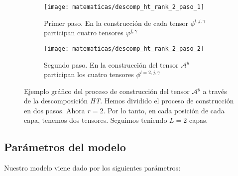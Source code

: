 \begin{figure}[H]
\centering
    \ajustarsubcaptions
    \begin{subfigure}{.5\textwidth}
        \centering
        \texttt{[image: matematicas/descomp\_ht\_rank\_2\_paso\_1]}
        \caption{Primer paso. En la construcción de cada tensor $\phi^{l, j, \gamma}$ participan cuatro tensores $\varphi^{j, \gamma}$}
    \end{subfigure}%
    \begin{subfigure}{.5\textwidth}
        \centering
        \texttt{[image: matematicas/descomp\_ht\_rank\_2\_paso\_2]}
        \caption{Segundo paso. En la construcción del tensor $\mathcal{A}^y$ participan los cuatro tensores $\phi^{l=2, j, \gamma}$}
    \end{subfigure}
    \caption{Ejemplo gráfico del proceso de construcción del tensor $\mathcal{A}^y$ a través de la descomposición \textit{HT}. Hemos dividido el proceso de construcción en dos pasos. Ahora $r = 2$. Por lo tanto, en cada posición de cada capa, tenemos dos tensores. Seguimos teniendo $L = 2$ capas. }
    \label{img:diagrama_ht_complejo}
\end{figure}


\subsection{Parámetros del modelo} \label{msubs:parametros_modelo_ht}

Nuestro modelo viene dado por los siguientes parámetros:


